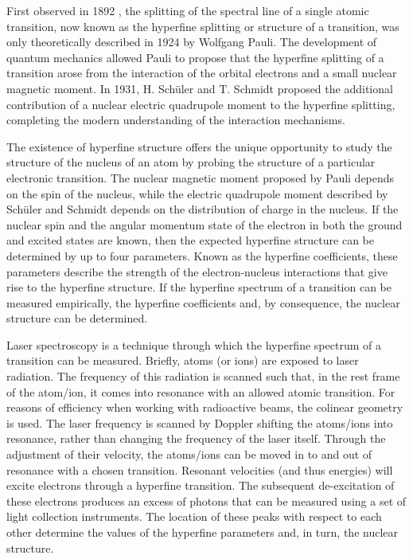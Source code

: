 First observed in 1892 \citep{michelson}, the splitting of the spectral line of a single atomic transition, now known as the hyperfine splitting or structure of a transition, was only theoretically described in 1924 by Wolfgang Pauli\citep{Pauli1924}. The development of quantum mechanics allowed Pauli to propose that the hyperfine splitting of a transition arose from the interaction of the orbital electrons and a small nuclear magnetic moment. In 1931, H. Schüler and T. Schmidt proposed the additional contribution of a nuclear electric quadrupole moment to the hyperfine splitting, completing the modern understanding of the interaction mechanisms\citep{Lieb2001}.

The existence of hyperfine structure offers the unique opportunity to study the structure of the nucleus of an atom by probing the structure of a particular electronic transition. The nuclear magnetic moment proposed by Pauli depends on the spin of the nucleus, while the electric quadrupole moment described by Schüler and Schmidt depends on the distribution of charge in the nucleus. If the nuclear spin and the angular momentum state of the electron in both the ground and excited states are known, then the expected hyperfine structure can be determined by up to four parameters. Known as the hyperfine coefficients, these parameters describe the strength of the electron-nucleus interactions that give rise to the hyperfine structure. If the hyperfine spectrum of a transition can be measured empirically, the hyperfine coefficients and, by consequence, the nuclear structure can be determined. 

Laser spectroscopy is a technique through which the hyperfine spectrum of a transition can be measured. Briefly, atoms (or ions) are exposed to laser radiation. The frequency of this radiation is scanned such that, in the rest frame of the atom/ion, it comes into resonance with an allowed atomic transition. For reasons of efficiency when working with radioactive beams, the colinear geometry is used. The laser frequency is scanned by Doppler shifting the atoms/ions into resonance, rather than changing the frequency of the laser itself. Through the adjustment of their velocity, the atoms/ions can be moved in to and out of resonance with a chosen transition. Resonant velocities (and thus energies) will excite electrons through a hyperfine transition. The subsequent de-excitation of these electrons produces an excess of photons that can be measured using a set of light collection instruments. The location of these peaks with respect to each other determine the values of the hyperfine parameters and, in turn, the nuclear structure. 

